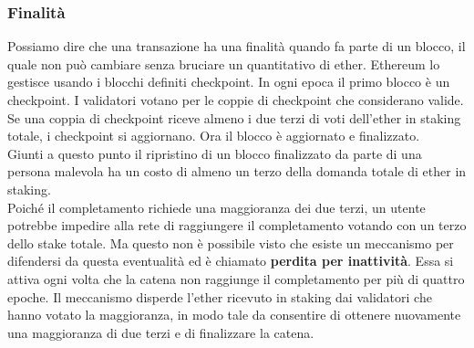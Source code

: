 \documentclass[a4paper,11pt]{report}
\begin{document}
\subsubsection{Finalità}
Possiamo dire che una transazione ha una finalità quando fa parte di un blocco, il quale non può cambiare senza bruciare un quantitativo di ether. Ethereum lo gestisce usando i blocchi definiti checkpoint. In ogni epoca il primo blocco è un checkpoint. I validatori votano per le coppie di checkpoint che considerano valide. Se una coppia di checkpoint riceve almeno i due terzi di voti dell'ether in staking totale, i checkpoint  si aggiornano. Ora il blocco è aggiornato e finalizzato.\\
Giunti a questo punto il ripristino di un blocco finalizzato da parte di una persona malevola ha un costo di almeno un terzo della domanda totale di ether in staking.\\
Poiché il completamento richiede una maggioranza dei due terzi, un utente potrebbe impedire alla rete di raggiungere il completamento votando con un terzo dello stake totale. Ma questo non è possibile visto che esiste un meccanismo per difendersi da questa eventualità ed è chiamato \textbf{perdita per inattività}. Essa si attiva ogni volta che la catena non raggiunge il completamento per più di quattro epoche. Il meccanismo disperde l'ether ricevuto in staking dai validatori che hanno votato la maggioranza, in modo tale da consentire di ottenere nuovamente una maggioranza di due terzi e di finalizzare la catena.
\end{document}
